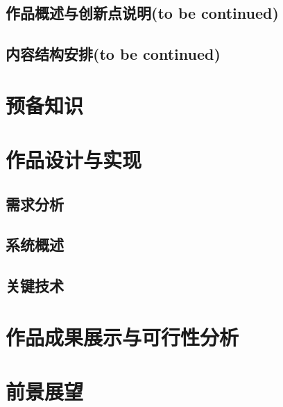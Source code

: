 \documentclass[zihao=-4]{ctexart}
\begin{document}
\subsection{作品概述与创新点说明(to be continued)}

\subsection{内容结构安排(to be continued)}

\section{预备知识}


\section{作品设计与实现}
\subsection{需求分析}
\subsection{系统概述}
\subsection{关键技术}

\section{作品成果展示与可行性分析}

\section{前景展望}
\end{document}
